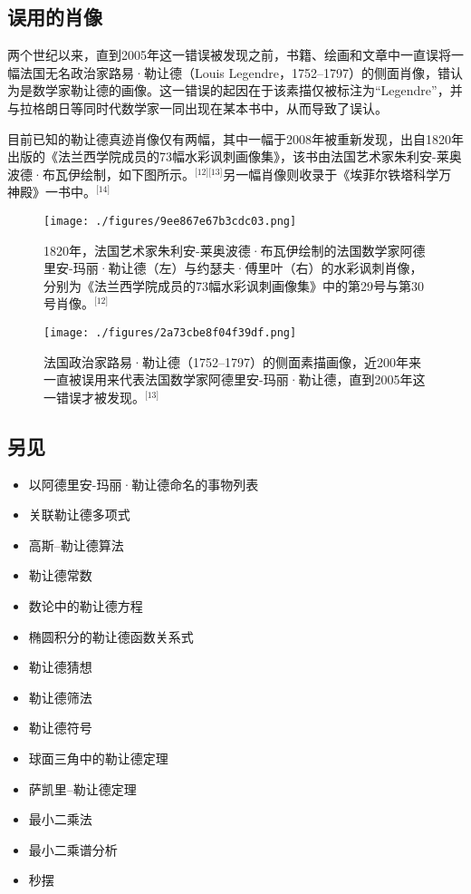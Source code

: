 \subsection{误用的肖像}
两个世纪以来，直到2005年这一错误被发现之前，书籍、绘画和文章中一直误将一幅法国无名政治家路易·勒让德（Louis Legendre，1752–1797）的侧面肖像，错认为是数学家勒让德的画像。这一错误的起因在于该素描仅被标注为“Legendre”，并与拉格朗日等同时代数学家一同出现在某本书中，从而导致了误认。

目前已知的勒让德真迹肖像仅有两幅，其中一幅于2008年被重新发现，出自1820年出版的《法兰西学院成员的73幅水彩讽刺画像集》，该书由法国艺术家朱利安-莱奥波德·布瓦伊绘制，如下图所示。\(^\text{[12][13]}\)另一幅肖像则收录于《埃菲尔铁塔科学万神殿》一书中。\(^\text{[14]}\)
\begin{figure}[ht]
\centering
\texttt{[image: ./figures/9ee867e67b3cdc03.png]}
\caption{1820年，法国艺术家朱利安-莱奥波德·布瓦伊绘制的法国数学家阿德里安-玛丽·勒让德（左）与约瑟夫·傅里叶（右）的水彩讽刺肖像，分别为《法兰西学院成员的73幅水彩讽刺画像集》中的第29号与第30号肖像。\(^\text{[12]}\)} \label{fig_adla_4}
\end{figure}
\begin{figure}[ht]
\centering
\texttt{[image: ./figures/2a73cbe8f04f39df.png]}
\caption{法国政治家路易·勒让德（1752–1797）的侧面素描画像，近200年来一直被误用来代表法国数学家阿德里安-玛丽·勒让德，直到2005年这一错误才被发现。\(^\text{[13]}\)} \label{fig_adla_5}
\end{figure}
\subsection{另见}
\begin{itemize}
\item 以阿德里安-玛丽·勒让德命名的事物列表
\item 关联勒让德多项式
\item 高斯–勒让德算法
\item 勒让德常数
\item 数论中的勒让德方程
\item 椭圆积分的勒让德函数关系式
\item 勒让德猜想
\item 勒让德筛法
\item 勒让德符号
\item 球面三角中的勒让德定理
\item 萨凯里–勒让德定理
\item 最小二乘法
\item 最小二乘谱分析
\item 秒摆
\end{itemize}
